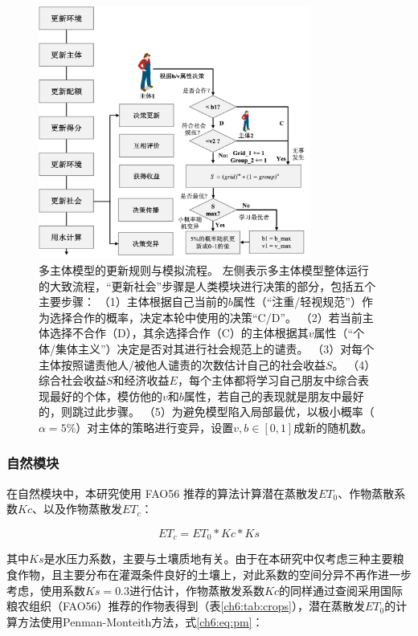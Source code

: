 \begin{figure}[htb]
    \centering
    \includegraphics[width=0.8\textwidth]{img/ch6/ch6_updates_diagram.png}
    \caption[多主体模型的更新规则与模拟流程]{多主体模型的更新规则与模拟流程。
    左侧表示多主体模型整体运行的大致流程，“更新社会”步骤是人类模块进行决策的部分，包括五个主要步骤：
        （1）主体根据自己当前的$b$属性（“注重/轻视规范”）作为选择合作的概率，决定本轮中使用的决策“C/D”。
        （2）若当前主体选择不合作（D），其余选择合作（C）的主体根据其$v$属性（“个体/集体主义”）决定是否对其进行社会规范上的谴责。
        （3）对每个主体按照谴责他人/被他人谴责的次数估计自己的社会收益$S$。
        （4）综合社会收益$S$和经济收益$E$，每个主体都将学习自己朋友中综合表现最好的个体，模仿他的$v$和$b$属性，若自己的表现就是朋友中最好的，则跳过此步骤。
        （5）为避免模型陷入局部最优，以极小概率（$\alpha = 5\%$）对主体的策略进行变异，设置$v, b \in [0, 1]$成新的随机数。
    }\label{ch6:fig:society}
\end{figure}

\subsubsection{自然模块}

在自然模块中，本研究使用 FAO56 推荐的算法计算潜在蒸散发$ET_0$、作物蒸散系数$Kc$、以及作物蒸散发$ET_c$：

\begin{equation}
    ET_c = ET_0 * Kc * Ks
    \label{ch6:eq:etc}
\end{equation}

其中$Ks$是水压力系数，主要与土壤质地有关。由于在本研究中仅考虑三种主要粮食作物，且主要分布在灌溉条件良好的土壤上，对此系数的空间分异不再作进一步考虑，使用系数$Ks = 0.3$进行估计，作物蒸散发系数$Kc$的同样通过查阅采用国际粮农组织（FAO56）推荐的作物表得到（表\ref{ch6:tab:crops}）\cite{chen2023}，潜在蒸散发$ET_0$的计算方法使用Penman-Monteith方法，式\ref{ch6:eq:pm}：

